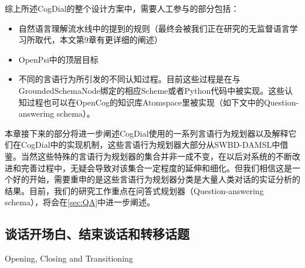 综上所述CogDial的整个设计方案中，需要人工参与的部分包括：
\begin{itemize}
\item 自然语言理解流水线中的提到的规则（最终会被我们正在研究的无监督语言学习所取代，本文第9章有更详细的阐述）
\item OpenPsi中的顶层目标
\item 不同的言语行为所引发的不同认知过程。目前这些过程是在与GroundedSchemaNode绑定的相应Scheme或者Python代码中被实现。这些认知过程也可以在OpenCog的知识库Atomspace里被实现（如下文中的Question-answering schema）。
\end{itemize}
本章接下来的部分将进一步阐述CogDial使用的一系列言语行为规划器以及解释它们在CogDial中的实现机制，这些言语行为规划器大部分从SWBD-DAMSL中借鉴。当然这些特殊的言语行为规划器的集合并非一成不变，在以后对系统的不断改进和完善过程中，无疑会导致对该集合一定程度的延伸和细化。但我们相信这是一个好的开始，需要重申的是这些言语行为规划器分类是大量人类对话的实证分析的结果。目前，我们的研究工作重点在问答式规划器（Question-answering schema），将会在\ref{sec:QA}中进一步阐述。

\subsection{谈话开场白、结束谈话和转移话题}{Opening, Closing and Transitioning}

